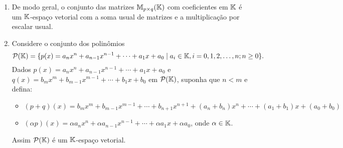 \begin{exemplo}
\begin{enumerate}[label={\arabic*})]
    \item De modo geral, o conjunto das matrizes $\mathbb{M}_{p \times q}(\mathbb{K})$ com coeficientes em $\mathbb{K}$ \'e um $\mathbb{K}$-espa\c{c}o vetorial com a soma usual de matrizes e a multiplica\c{c}\~ao por escalar usual.

    \item Considere o conjunto dos polin\^omios
          \[
            \mathcal{P}(\mathbb{K}) = \{ p(x) = a_nx^n + a_{n - 1}x^{n - 1} + \cdots + a_1x + a_0 \mid a_i \in \mathbb{K}, i = 0, 1, 2, \dots, n; n \ge 0 \}.
          \]
          Dados $p(x) = a_nx^n + a_{n - 1}x^{n - 1} + \cdots + a_1x + a_0$ e $q(x) = b_mx^m + b_{m - 1}x^{m - 1} + \cdots + b_1x + b_0$ em $\mathcal{P}(\mathbb{K})$, suponha que $n < m$ e defina:
          \begin{itemize}
            \item $(p + q)(x) = b_mx^m + b_{m - 1}x^{m - 1} + \cdots + b_{n + 1}x^{n + 1} + (a_n + b_n)x^n + \cdots + (a_1 + b_1)x + (a_0 + b_0)$
            \item $(\alpha p)(x) = \alpha a_nx^n + \alpha a_{n - 1}x^{n - 1} + \cdots + \alpha a_1x + \alpha a_0$, onde $\alpha \in \mathbb{K}$.
          \end{itemize}
          Assim $\mathcal{P}(\mathbb{K})$ \'e um $\mathbb{K}$-espa\c{c}o vetorial.


\end{enumerate}
\end{exemplo}
